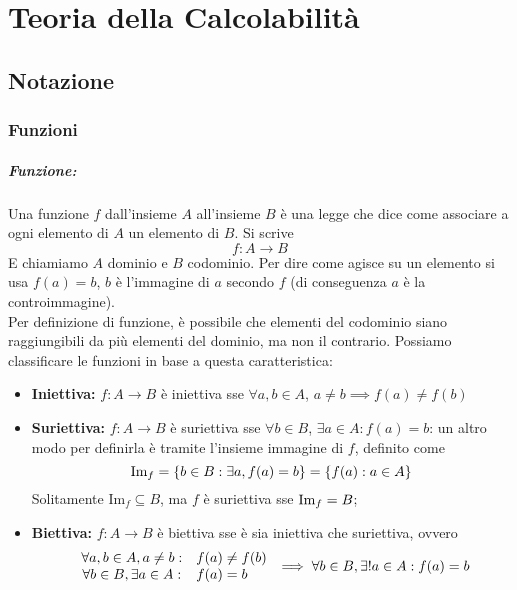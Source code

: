 
\chapter{Teoria della Calcolabilità}

\section{Notazione}

\subsection{Funzioni}

\paragraph{Funzione:} Una funzione $f$ dall'insieme $A$ all'insieme $B$ è una legge che dice come associare a ogni elemento di $A$ un elemento di $B$. Si scrive
$$ f: A \rightarrow B $$
E chiamiamo $A$ dominio e $B$ codominio. Per dire come agisce su un elemento si usa $f(a) = b$, $b$ è l'immagine di $a$ secondo $f$ (di conseguenza $a$ è la controimmagine).\\
Per definizione di funzione, è possibile che elementi del codominio siano raggiungibili da più elementi del dominio, ma non il contrario. Possiamo classificare le funzioni in base a questa caratteristica:
\begin{itemize}
	\item \textbf{Iniettiva:} $f: A \rightarrow B$ è iniettiva sse $\forall a,b \in A$, $a \neq b \implies f(a) \neq f(b)$
	\item \textbf{Suriettiva:} $f: A \rightarrow B$ è suriettiva sse $\forall b \in B$, $\exists a \in A: f(a) = b$: un altro modo per definirla è tramite l'insieme immagine di $f$, definito come
	$$ \text{Im}_f = \{b \in B: \exists a, f(a) = b \} = \{f(a): a \in A \} $$
	Solitamente $\text{Im}_f \subseteq B$, ma $f$ è suriettiva sse $ \text{Im}_f = B$;
	\item \textbf{Biettiva:} $f: A \rightarrow B$ è biettiva sse è sia iniettiva che suriettiva, ovvero
	$$
	\begin{array}{c l}
		\forall a, b \in A, a \neq b: & f(a) \neq f(b) \\
		\forall b \in B, \exists a \in A: & f(a) = b
	\end{array}
	\implies \forall b \in B, \exists! a \in A: f(a) = b
	$$
\end{itemize}

